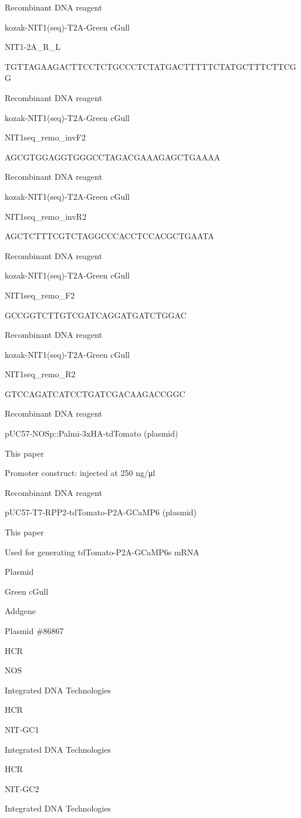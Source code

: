 \documentclass[
  10pt,
  onecolumn]{article}
\begin{document}
Recombinant DNA reagent

kozak-NIT1(seq)-T2A-Green cGull

NIT1-2A\_R\_L

TGTTAGAAGACTTCCTCTGCCCTCTATGACTTTTTCTATGCTTTCTTCGG

Recombinant DNA reagent

kozak-NIT1(seq)-T2A-Green cGull

NIT1seq\_remo\_invF2

AGCGTGGAGGTGGGCCTAGACGAAAGAGCTGAAAA

Recombinant DNA reagent

kozak-NIT1(seq)-T2A-Green cGull

NIT1seq\_remo\_invR2

AGCTCTTTCGTCTAGGCCCACCTCCACGCTGAATA

Recombinant DNA reagent

kozak-NIT1(seq)-T2A-Green cGull

NIT1seq\_remo\_F2

GCCGGTCTTGTCGATCAGGATGATCTGGAC

Recombinant DNA reagent

kozak-NIT1(seq)-T2A-Green cGull

NIT1seq\_remo\_R2

GTCCAGATCATCCTGATCGACAAGACCGGC

Recombinant DNA reagent

pUC57-NOSp::Palmi-3xHA-tdTomato (plasmid)

This paper

Promoter construct: injected at 250 ng/μl

Recombinant DNA reagent

pUC57-T7-RPP2-tdTomato-P2A-GCaMP6 (plasmid)

This paper

Used for generating tdTomato-P2A-GCaMP6s mRNA

Plasmid

Green cGull

Addgene

Plasmid \#86867

HCR

NOS

Integrated DNA Technologies

HCR

NIT-GC1

Integrated DNA Technologies

HCR

NIT-GC2

Integrated DNA Technologies
\end{document}
